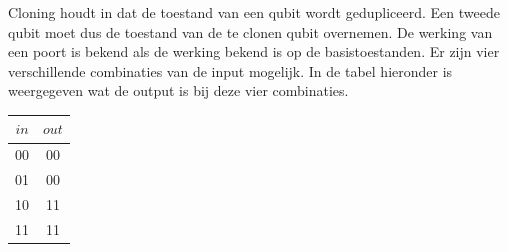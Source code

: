 \documentclass[../main.tex]{subfiles}
\begin{document}

Cloning houdt in dat de toestand van een qubit wordt gedupliceerd. Een tweede qubit moet dus de toestand van de te clonen qubit overnemen. 
De werking van een poort is bekend als de werking bekend is op de basistoestanden.
Er zijn vier verschillende combinaties van de input mogelijk. In de tabel hieronder  is weergegeven wat de output is bij deze vier combinaties.


\begin{flushleft}
\begin{minipage}{.25\textwidth}
\begin{tabular}{|c||c|}
\hline
 $in$  & $out$  \\ \hline
 00    & 00     \\ \hline
 01    & 00     \\ \hline
 10    & 11     \\ \hline
 11    & 11     \\ \hline
\end{tabular}
\end{minipage}%
\hfill
\begin{minipage}{.7\textwidth}
\end{minipage}
\end{flushleft}
\end{document}

